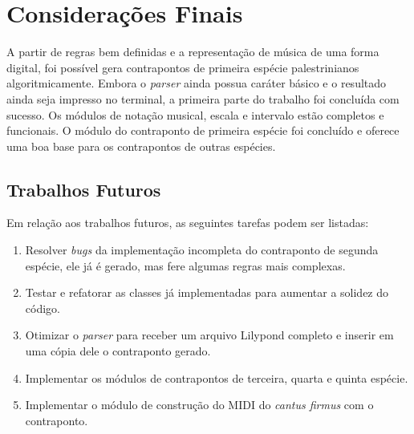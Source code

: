\chapter[Considerações Finais]{Considerações Finais}

  A partir de regras bem definidas e a representação de música de uma forma digital, foi possível gera contrapontos de primeira espécie palestrinianos algoritmicamente. Embora o \textit{parser} ainda possua caráter básico e o resultado ainda seja impresso no terminal, a primeira parte do trabalho foi concluída com sucesso. Os módulos de notação musical, escala e intervalo estão completos e funcionais. O módulo do contraponto de primeira espécie foi concluído e oferece uma boa base para os contrapontos de outras espécies.

  \section[Trabalhos Futuros]{Trabalhos Futuros}

    Em relação aos trabalhos futuros, as seguintes tarefas podem ser listadas:

    \begin{enumerate}
      \item Resolver \textit{bugs} da implementação incompleta do contraponto de segunda espécie, ele já é gerado, mas fere algumas regras mais complexas.
      \item Testar e refatorar as classes já implementadas para aumentar a solidez do código.
      \item Otimizar o \textit{parser} para receber um arquivo Lilypond completo e inserir em uma cópia dele o contraponto gerado.
      \item Implementar os módulos de contrapontos de terceira, quarta e quinta espécie.
      \item Implementar o módulo de construção do MIDI do \textit{cantus firmus} com o contraponto.
    \end{enumerate}
